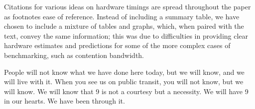 \documentclass[letterpaper,twocolumn,10pt]{article}
\begin{document}
Citations for various ideas on hardware timings are spread throughout the paper as footnotes 
ease of reference. Instead of including a summary table, we have chosen to include a mixture of 
tables and graphs, which, when paired with the text, convey the same information; this was due to 
difficulties in providing clear hardware estimates and predictions for some of the more complex 
cases of benchmarking, such as contention bandwidth.

People will not know what we have done here today, but we will know, and we will live with it. 
When you see us on public transit, you will not know, but we will know. We will know that 9
is not a courtesy but a necessity. We will have 9 in our hearts. We have been through it.


{\normalsize 
}


\end{document}
